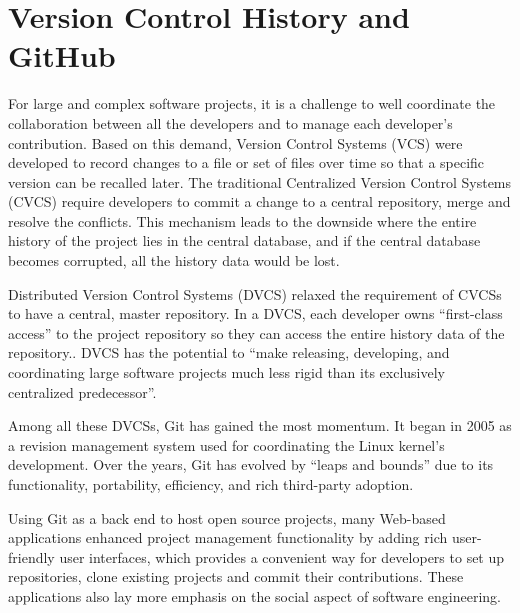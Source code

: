
\label{chapter:relatedworks}

\newlength{\savedunitlength}
\setlength{\unitlength}{2em}

\section{Version Control History and GitHub}

For large and complex software projects, it is a challenge to well coordinate the collaboration between all the developers and to manage each developer's contribution. Based on this demand, Version Control Systems (VCS) were developed to record changes to a file or set of files over time so that a specific version can be recalled later. \cite{chacon2009pro} The traditional Centralized Version Control Systems (CVCS) require developers to commit a change to a central repository, merge and resolve the conflicts. This mechanism leads to the downside where the entire history of the project lies in the central database, and if the central database becomes corrupted, all the history data would be lost. \cite{chacon2009pro}\cite{5071408} 

Distributed Version Control Systems (DVCS) relaxed the requirement of CVCSs to have a central, master repository. In a DVCS, each developer owns ``first-class access'' to the project repository so they can access the entire history data of the repository.\cite{5071408}. DVCS has the potential to ``make releasing, developing, and coordinating large software projects much less rigid than its exclusively centralized predecessor''.\cite{6607694}

Among all these DVCSs, Git has gained the most momentum. It began in 2005 as a revision management system used for coordinating the Linux kernel's development. Over the years, Git has evolved by ``leaps and bounds'' due to its functionality, portability, efficiency, and rich third-party adoption.\cite{6188603}

Using Git as a back end to host open source projects, many Web-based applications enhanced project management functionality by adding rich user-friendly user interfaces, which provides a convenient way for developers to set up repositories, clone existing projects and commit their contributions.\cite{6188603} These applications also lay more emphasis on the social aspect of software engineering. 


